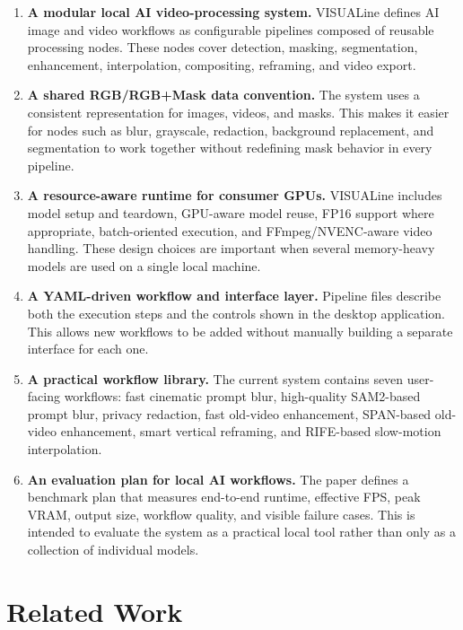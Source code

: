 \documentclass[11pt,a4paper]{article}
\begin{document}
\begin{enumerate}[leftmargin=*]
    \item \textbf{A modular local AI video-processing system.} VISUALine defines AI image and video workflows as configurable pipelines composed of reusable processing nodes. These nodes cover detection, masking, segmentation, enhancement, interpolation, compositing, reframing, and video export.

    \item \textbf{A shared RGB/RGB+Mask data convention.} The system uses a consistent representation for images, videos, and masks. This makes it easier for nodes such as blur, grayscale, redaction, background replacement, and segmentation to work together without redefining mask behavior in every pipeline.

    \item \textbf{A resource-aware runtime for consumer GPUs.} VISUALine includes model setup and teardown, GPU-aware model reuse, FP16 support where appropriate, batch-oriented execution, and FFmpeg/NVENC-aware video handling. These design choices are important when several memory-heavy models are used on a single local machine.

    \item \textbf{A YAML-driven workflow and interface layer.} Pipeline files describe both the execution steps and the controls shown in the desktop application. This allows new workflows to be added without manually building a separate interface for each one.

    \item \textbf{A practical workflow library.} The current system contains seven user-facing workflows: fast cinematic prompt blur, high-quality SAM2-based prompt blur, privacy redaction, fast old-video enhancement, SPAN-based old-video enhancement, smart vertical reframing, and RIFE-based slow-motion interpolation.

    \item \textbf{An evaluation plan for local AI workflows.} The paper defines a benchmark plan that measures end-to-end runtime, effective FPS, peak VRAM, output size, workflow quality, and visible failure cases. This is intended to evaluate the system as a practical local tool rather than only as a collection of individual models.
\end{enumerate}

\section{Related Work}
\end{document}
